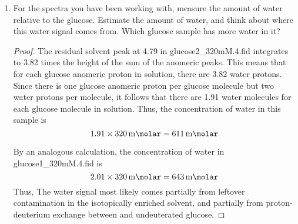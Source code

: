 \documentclass[../psets.tex]{subfiles}
\begin{document}
\begin{enumerate}
\begin{proof}
        Additionally, there does not appear to be a significant difference in the anomeric ratio. Rather, the $\alpha:\beta$ ratio appears to be approximately $62:38$ instead of $61:39$.
    \end{proof}
    \item For the spectra you have been working with, measure the amount of water relative to the glucose. Estimate the amount of water, and think about where this water signal comes from. Which glucose sample has more water in it?
    \begin{proof}
        The residual solvent peak at \SI{4.79}{\partspermillion} in glucose2\_320mM.4.fid integrates to 3.82 times the height of the sum of the anomeric peaks. This means that for each glucose anomeric proton in solution, there are 3.82 water protons. Since there is one glucose anomeric proton per glucose molecule but two water protons per molecule, it follows that there are 1.91 water molecules for each glucose molecule in solution. Thus, the concentration of water in this sample is
        \begin{equation*}
            1.91\times\SI{320}{\milli\molar} = \SI{611}{\milli\molar}
        \end{equation*}\par
        By an analogous calculation, the concentration of water in glucose1\_320mM.4.fid is
        \begin{equation*}
            2.01\times\SI{320}{\milli\molar} = \SI{643}{\milli\molar}
        \end{equation*}
        Thus,  The water signal most likely comes partially from leftover  contamination in the isotopically enriched  solvent, and partially from proton-deuterium exchange between  and undeuterated glucose.
    \end{proof}
\end{enumerate}
\end{document}
